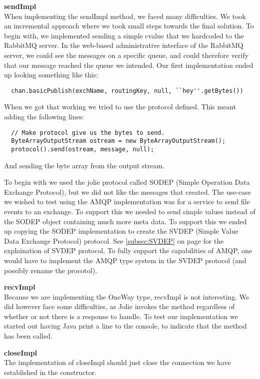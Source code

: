 \noindent\textbf{sendImpl}\\
When implementing the sendImpl method, we faced many difficulties. We took an incremental approach where we took small steps towards the final solution. To begin with, we implemented sending a simple cvalue that we hardcoded to the RabbitMQ server. In the web-based administrative interface of the RabbitMQ server, we could see the messages on a specific queue, and could therefore verify that our message reached the queue we intended. Our first implementation ended up looking something like this:
\begin{lstlisting}
  chan.basicPublish(exchName, routingKey, null, ``hey''.getBytes())
\end{lstlisting}

When we got that working we tried to use the protocol defined. This meant adding the following lines:
\begin{lstlisting}
  // Make protocol give us the bytes to send.
  ByteArrayOutputStream ostream = new ByteArrayOutputStream();
  protocol().send(ostream, message, null);
\end{lstlisting}
And sending the byte array from the output stream.

To begin with we used the jolie protocol called SODEP (Simple Operation Data Exchange Protocol)\cite{SODEP}, but we did not like the messages that created. The use-case we wished to test using the AMQP implementation was for a service to send file events to an exchange. To support this we needed to send simple values instead of the SODEP object containing much more meta data. To support this we ended up copying the SODEP implementation to create the SVDEP (Simple Value Data Exchange Protocol) protocol.
See \ref{subsec:SVDEP} on page \pageref{subsec:SVDEP} for the explaination of SVDEP protocol. To fully support the capabilities of AMQP, one would have to implement the AMQP type system in the SVDEP protocol (and possibly rename the procotol).

\noindent\textbf{recvImpl}\\
Because we are implementing the OneWay type, recvImpl is not interesting. We did however face some difficulties, as Jolie invokes the method regardless of whether or not there is a response to handle. To test our implementation we started out having Java print a line to the console, to indicate that the method has been called.

\noindent\textbf{closeImpl}\\
The implementation of closeImpl should just close the connection we have established in the constructor.


